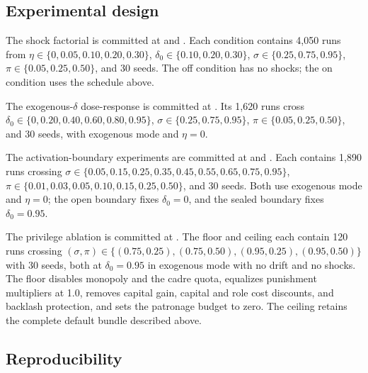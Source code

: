 \documentclass[12pt]{article}
\begin{document}
\subsection{Experimental design}

The shock factorial is committed at
 and
. Each condition contains
4,050 runs from \(\eta\in\{0,\allowbreak 0.05,\allowbreak 0.10,\allowbreak
0.20,\allowbreak 0.30\}\), \(\delta_0\in\{0.10,0.20,0.30\}\),
\(\sigma\in\{0.25,0.75,0.95\}\), \(\pi\in\{0.05,0.25,0.50\}\), and 30 seeds. The
off condition has no shocks; the on condition uses the schedule above.

The exogenous-\(\delta\) dose-response is committed at
. Its 1,620 runs cross
\(\delta_0\in\{0,\allowbreak 0.20,\allowbreak 0.40,\allowbreak 0.60,\allowbreak
0.80,\allowbreak 0.95\}\), \(\sigma\in\{0.25,0.75,0.95\}\),
\(\pi\in\{0.05,0.25,0.50\}\), and 30 seeds, with exogenous mode and \(\eta=0\).

The activation-boundary experiments are committed at
 and
. Each contains 1,890 runs
crossing \(\sigma\in\{0.05,\allowbreak 0.15,\allowbreak 0.25,\allowbreak
0.35,\allowbreak 0.45,\allowbreak 0.55,\allowbreak 0.65,\allowbreak
0.75,\allowbreak 0.95\}\), \(\pi\in\{0.01,\allowbreak 0.03,\allowbreak
0.05,\allowbreak 0.10,\allowbreak 0.15,\allowbreak 0.25,\allowbreak 0.50\}\),
and 30 seeds. Both use exogenous mode and \(\eta=0\); the open boundary fixes
\(\delta_0=0\), and the sealed boundary fixes \(\delta_0=0.95\).

The privilege ablation is committed at
. The floor and ceiling
each contain 120 runs crossing
\((\sigma,\pi)\in\{(0.75,0.25),\allowbreak (0.75,0.50),\allowbreak
(0.95,0.25),\allowbreak (0.95,0.50)\}\) with 30 seeds, both at \(\delta_0=0.95\)
in exogenous mode with no drift and no shocks. The floor disables monopoly and
the cadre quota, equalizes punishment multipliers at 1.0, removes capital gain,
capital and role cost discounts, and backlash protection, and sets the patronage
budget to zero. The ceiling retains the complete default bundle described above.

\subsection{Reproducibility}
\end{document}
